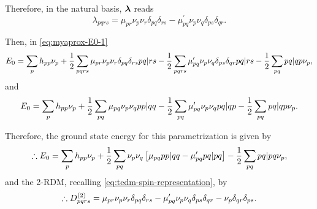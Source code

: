 Therefore, in the natural basis, $ \boldsymbol{\mathrm{\lambda}}$ reads
\begin{equation}
    \lambda_{pqrs} =
    \mu_{pr} \nu_p \nu_r \delta_{pq} \delta_{rs}
    -
    \mu_{pq}^{\prime} \nu_p \nu_q \delta_{ps} \delta_{qr}
    .
\end{equation}

Then, in \cref{eq:myaprox-E0-1}
\begin{equation}
    E_0 =
    \sum_{p} h_{pp} \nu_p +
    \frac{1}{2} \sum_{pqrs} 
    \mu_{pr} \nu_p \nu_r \delta_{pq} \delta_{rs}
    \PBraket{pq | rs}
    -
    \frac{1}{2} \sum_{pqrs} 
    \mu_{pq}^{\prime} \nu_p \nu_q \delta_{ps} \delta_{qr}
    \PBraket{pq | rs}
    -
    \frac{1}{2} \sum_{pq} \PBraket{pq | qp} \nu_p
    ,
\end{equation}
and
\begin{equation}
    E_0 =
    \sum_{p} h_{pp} \nu_p +
    \frac{1}{2} \sum_{pq} 
    \mu_{pq} \nu_p \nu_q 
    \PBraket{pp | qq}
    -
    \frac{1}{2} \sum_{pq} 
    \mu_{pq}^{\prime} \nu_p \nu_q
    \PBraket{pq | qp}
    -
    \frac{1}{2} \sum_{pq} \PBraket{pq | qp} \nu_p
    .
\end{equation}

Therefore, the ground state energy for this parametrization is given by
\begin{equation}
    \therefore
    E_0 =
    \sum_{p} h_{pp} \nu_p +
    \frac{1}{2} \sum_{pq} 
    \nu_p \nu_q
    \left[ 
        \mu_{pq} \PBraket{pp | qq}
        -
        \mu_{pq}^{\prime} \PBraket{pq | pq}
    \right]
    -
    \frac{1}{2} \sum_{pq} 
    \PBraket{pq | pq} \nu_p
    ,
\end{equation}
and the 2-RDM, recalling \cref{eq:tedm-spin-representation}, by 
\begin{equation} \label{eq:AQ-approximation}
    \therefore
    D^{\left( 2 \right)}_{pqrs} =
    \mu_{pr} \nu_p \nu_r \delta_{pq} \delta_{rs}
    -
    \mu_{pq}^{\prime} \nu_p \nu_q \delta_{ps} \delta_{qr}
    -
    \nu_p \delta_{qr} \delta_{ps}
    .
\end{equation}


